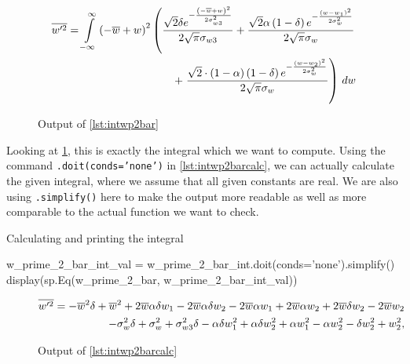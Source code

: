 \begin{figure}[!ht]
    \centering
    \caption{Output of \cref{lst:intwp2bar}}
    \label{fig:intwp2barout}
    \begin{align}
        \overline{w'^2}
        = \int\limits_{-\infty}^{\infty}
        \left(- \overline{w} + w\right)^{2}
        \left(\frac{\sqrt{2} \delta e^{- \frac{\left(- \overline{w} + w\right)^{2}}{2 \sigma_{w3}^{2}}}}{2 \sqrt{\pi} \sigma_{w3}}
        + \frac{\sqrt{2} \alpha \left(1 - \delta\right) e^{- \frac{\left(w - w_{1}\right)^{2}}{2 \sigma_{w}^{2}}}}{2 \sqrt{\pi} \sigma_{w}}\right. \nonumber\\
        + \left.\frac{\sqrt{2} \cdot \left(1 - \alpha\right) \left(1 - \delta\right) e^{- \frac{\left(w - w_{2}\right)^{2}}{2 \sigma_{w}^{2}}}}{2 \sqrt{\pi} \sigma_{w}}\right)
        \, dw \nonumber
    \end{align}
\end{figure}
Looking at \cref{fig:intwp2barout},
this is exactly the integral which we want to compute.
Using the command \texttt{.doit(conds='none')} in \cref{lst:intwp2barcalc},
we can actually calculate the given integral,
where we assume that all given constants are real.
We are also using \texttt{.simplify()} here
to make the output more readable as well as more comparable to the actual function we want to check.
\begin{listing}[!ht]
    \caption{Calculating and printing the integral}
    \label{lst:intwp2barcalc}
    \begin{pythoncode}
        w_prime_2_bar_int_val = w_prime_2_bar_int.doit(conds='none').simplify()
        display(sp.Eq(w_prime_2_bar, w_prime_2_bar_int_val))
    \end{pythoncode}
\end{listing}
\begin{figure}[!ht]
    \centering
    \caption{Output of \cref{lst:intwp2barcalc}}
    \label{fig:intwp2barcalcout}
    \begin{align}
        \overline{w'^2}
        = - \overline{w}^{2} \delta + \overline{w}^{2} + 2 \overline{w} \alpha \delta w_{1} - 2 \overline{w} \alpha \delta w_{2} - 2 \overline{w} \alpha w_{1} + 2 \overline{w} \alpha w_{2} + 2 \overline{w} \delta w_{2} - 2 \overline{w} w_{2} \nonumber\\
        - \sigma_{w}^{2} \delta + \sigma_{w}^{2} + \sigma_{w3}^{2} \delta - \alpha \delta w_{1}^{2} + \alpha \delta w_{2}^{2} + \alpha w_{1}^{2} - \alpha w_{2}^{2} - \delta w_{2}^{2} + w_{2}^{2} \nonumber,
    \end{align}
\end{figure}

